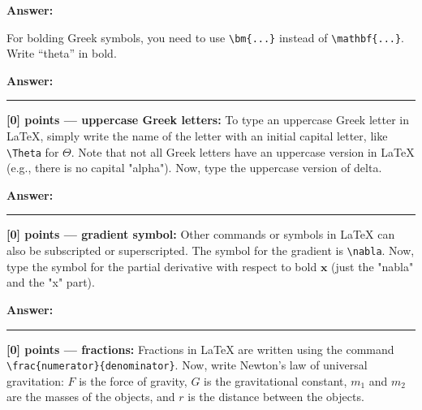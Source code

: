 \documentclass{article}
\newcommand{\mydivider}{\vspace{1em}\hrule\vspace{1em}}
\begin{document}
\begin{tcolorbox}
\textbf{Answer: }


\end{tcolorbox}

For bolding Greek symbols, you need to use \verb|\bm{...}| instead of \verb|\mathbf{...}|.  Write ``theta'' in bold.

\begin{tcolorbox}
\textbf{Answer: }


\end{tcolorbox}

\mydivider

\noindent\textbf{[0] points --- uppercase Greek letters:} To type an uppercase Greek letter in LaTeX, simply write the name of the letter with an initial capital letter, like \verb|\Theta| for $\Theta$. Note that not all Greek letters have an uppercase version in LaTeX (e.g., there is no capital "alpha"). Now, type the uppercase version of delta.

\begin{tcolorbox}
\textbf{Answer: }


\end{tcolorbox}


\mydivider

\noindent\textbf{[0] points --- gradient symbol:} Other commands or symbols in LaTeX can also be subscripted or superscripted. The symbol for the gradient is \verb|\nabla|. Now, type the symbol for the partial derivative with respect to bold $\mathbf{x}$ (just the "nabla" and the "x" part).

\begin{tcolorbox}
\textbf{Answer: }


\end{tcolorbox}


\mydivider

\noindent\textbf{[0] points --- fractions:} Fractions in LaTeX are written using the command \verb|\frac{numerator}{denominator}|. Now, write Newton's law of universal gravitation:
$F$ is the force of gravity, $G$ is the gravitational constant, $m_1$ and $m_2$ are the masses of the objects, and $r$ is the distance between the objects.
\end{document}
